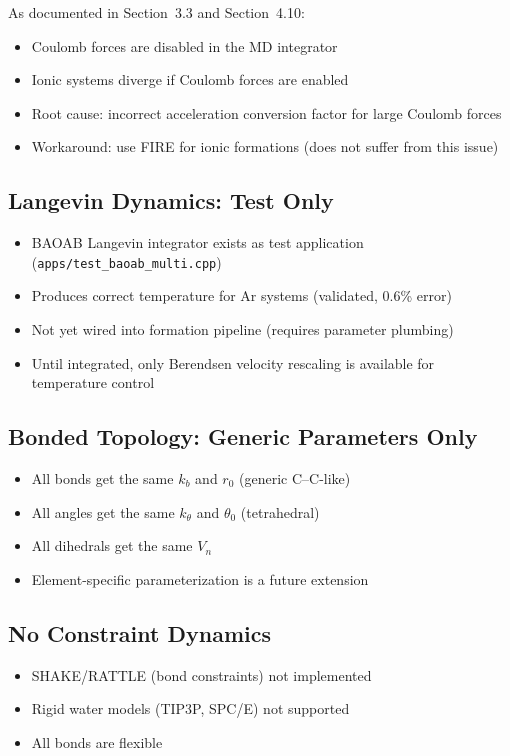 \documentclass[11pt]{article}
\begin{document}
As documented in Section~3.3 and Section~4.10:
\begin{itemize}
\item Coulomb forces are disabled in the MD integrator
\item Ionic systems diverge if Coulomb forces are enabled
\item Root cause: incorrect acceleration conversion factor for large Coulomb forces
\item Workaround: use FIRE for ionic formations (does not suffer from this issue)
\end{itemize}

\subsection{Langevin Dynamics: Test Only}

\begin{itemize}
\item BAOAB Langevin integrator exists as test application (\texttt{apps/test\_baoab\_multi.cpp})
\item Produces correct temperature for Ar systems (validated, 0.6\% error)
\item Not yet wired into formation pipeline (requires parameter plumbing)
\item Until integrated, only Berendsen velocity rescaling is available for temperature control
\end{itemize}

\subsection{Bonded Topology: Generic Parameters Only}

\begin{itemize}
\item All bonds get the same $k_b$ and $r_0$ (generic C--C-like)
\item All angles get the same $k_\theta$ and $\theta_0$ (tetrahedral)
\item All dihedrals get the same $V_n$
\item Element-specific parameterization is a future extension
\end{itemize}

\subsection{No Constraint Dynamics}

\begin{itemize}
\item SHAKE/RATTLE (bond constraints) not implemented
\item Rigid water models (TIP3P, SPC/E) not supported
\item All bonds are flexible
\end{itemize}
\end{document}
